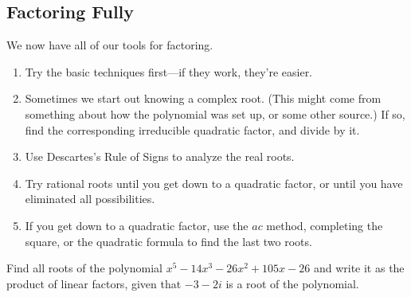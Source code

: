 \subsection{Factoring Fully} 
We now have all of our tools for factoring.
\begin{enumerate}
\item Try the basic techniques first---if they work, they're easier.
\item Sometimes we start out knowing a complex root. (This might come from something about how the polynomial was set up, or some other source.) If so, find the corresponding irreducible quadratic factor, and divide by it.
\item Use Descartes's Rule of Signs to analyze the real roots.
\item Try rational roots until you get down to a quadratic factor, or until you have eliminated all possibilities.
\item If you get down to a quadratic factor, use the $ac$ method, completing the square, or the quadratic formula to find the last two roots.
\end{enumerate}
\begin{Example}
Find all roots of the polynomial $x^5-14x^3-26x^2+105x-26$ and write it as the product of linear factors, given that $-3-2i$ is a root of the polynomial.
\end{Example}
\fillpaper
\clearpage
\fillpaper